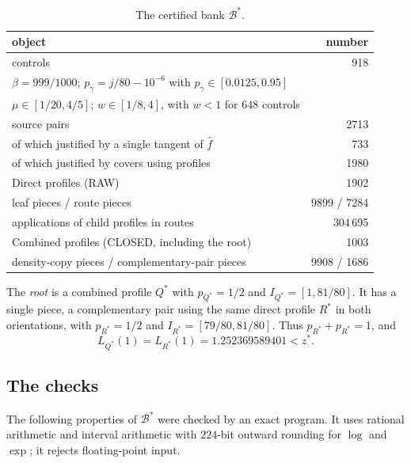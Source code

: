 \documentclass[11pt]{article}
\theoremstyle{definition}
\theoremstyle{remark}
\newcommand{\fh}{\widehat f}
\begin{document}
\begin{table}[ht]
\centering
\begin{tabular}{lr}
\toprule
object & number\\
\midrule
controls & 918\\
\quad $\beta=999/1000$; $p_\gamma=j/80-10^{-6}$ with $p_\gamma\in[0.0125,0.95]$ & \\
\quad $\mu\in[1/20,4/5]$; $w\in[1/8,4]$, with $w<1$ for $648$ controls & \\
source pairs & 2713\\
\quad of which justified by a single tangent of $\fh$ & 733\\
\quad of which justified by covers using profiles & 1980\\
Direct profiles (RAW) & 1902\\
\quad leaf pieces / route pieces & 9899 / 7284\\
\quad applications of child profiles in routes & 304\,695\\
Combined profiles (CLOSED, including the root) & 1003\\
\quad density-copy pieces / complementary-pair pieces & 9908 / 1686\\
\bottomrule
\end{tabular}
\caption{The certified bank $\mathcal B^*$.}\label{tab:bank}
\end{table}

The \emph{root} is a combined profile $Q^*$ with $p_{Q^*}=1/2$ and $I_{Q^*}=[1,81/80]$. It has a single piece, a
complementary pair using the same direct profile $R^*$ in both orientations, with $p_{R^*}=1/2$ and $I_{R^*}=[79/80,81/80]$.
Thus $p_{R^*}+p_{R^*}=1$, and
\[
L_{Q^*}(1)=L_{R^*}(1)=1.252369589401<z^*.
\]

\subsection{The checks}

The following properties of $\mathcal B^*$ were checked by an exact program. It uses rational arithmetic and
interval arithmetic with $224$-bit outward rounding for $\log$ and $\exp$; it rejects floating-point input.
\end{document}
